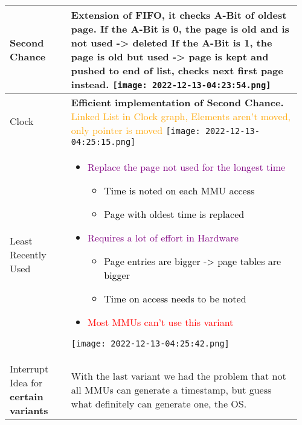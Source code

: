 \documentclass[main.tex,fontsize=8pt,paper=a4,paper=portrait,DIV=calc,]{scrartcl}
\begin{document}
\begin{table}[ht!]
\begin{tabular}{|m{0.2\linewidth}|m{0.755\linewidth}|}
\hline
Second Chance & 
\textbf{Extension of FIFO, it checks A-Bit of oldest page.}\newline
If the A-Bit is 0, the page is \textbf{old and is not used} -> deleted\newline
If the A-Bit is 1, the page is \textbf{old but used} -> page is kept and pushed to end of list, checks next first page instead.\newline
\texttt{[image: 2022-12-13-04:23:54.png]}\\
\hline
Clock & 
\textbf{Efficient implementation of Second Chance.}\newline
\textcolor{orange}{Linked List in Clock graph, Elements aren't moved, only pointer is moved}\newline
\texttt{[image: 2022-12-13-04:25:15.png]}\\
\hline
Least Recently Used & 
\begin{itemize}
\item \textcolor{purple}{Replace the page not used for the longest time}\newline
  \begin{itemize}
  \item \textcolor{black}{Time is noted on each MMU access}
  \item \textcolor{black}{Page with oldest time is replaced}
  \end{itemize}  
\item \textcolor{purple}{Requires a lot of effort in Hardware}\newline
  \begin{itemize}
  \item \textcolor{black}{Page entries are bigger -> page tables are bigger}
  \item \textcolor{black}{Time on access needs to be noted}
  \end{itemize}  
\item \textcolor{red}{Most MMUs can't use this variant}
\vspace{-3mm}
\end{itemize} 
\texttt{[image: 2022-12-13-04:25:42.png]}\\
\hline
Interrupt Idea for \textbf{certain variants} & 
With the last variant we had the problem that not all MMUs can generate a timestamp, but guess what definitely can generate one, the OS.\newline

\end{tabular}
\end{table}
\end{document}
